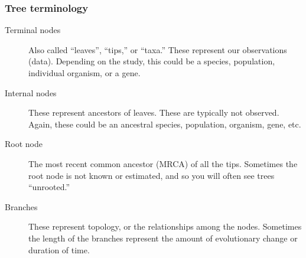 \begin{frame}
    \frametitle{Tree terminology}
    \begin{description}
        \item[Terminal nodes]
            Also called ``leaves'', ``tips,'' or ``taxa.''
            These represent our observations (data).
            Depending on the study, this could be a species, population,
            individual organism, or a gene.
        \item[Internal nodes]
            These represent ancestors of leaves.
            These are typically not observed.
            Again, these could be an ancestral species, population,
            organism, gene, etc.
        \item[Root node]
            The most recent common ancestor (MRCA) of all the tips.  Sometimes
            the root node is not known or estimated, and so you will often see
            trees ``unrooted.''
        \item[Branches]
            These represent topology, or the relationships among the nodes.
            Sometimes the length of the branches represent the amount of
            evolutionary change or duration of time.
    \end{description}
\end{frame}

